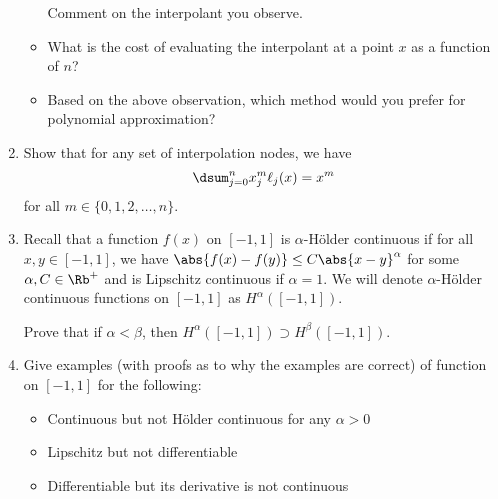 \documentclass{article}
\begin{document}
\begin{enumerate}
\begin{itemize}
\begin{itemize}
			\end{itemize}
			Comment on the interpolant you observe.
			\item
			What is the cost of evaluating the interpolant at a point $x$ as a function of $n$?
			\item
			Based on the above observation, which method would you prefer for polynomial approximation?
		\end{itemize}
		\item
			Show that for any set of interpolation nodes, we have
			$$\dsum_{j=0}^n x_j^m \ell_j(x) = x^m$$
			for all $m \in \{0,1,2,\ldots,n\}$.
		\item
		Recall that a function $f(x)$ on $[-1,1]$ is $\alpha$-H\"{o}lder continuous if for all $x,y \in [-1,1]$, we have $\abs{ f(x)-f(y)} \leq C \abs{x-y}^{\alpha}$ for some $\alpha,C \in \Rb^+$ and is Lipschitz continuous if $\alpha=1$. We will denote $\alpha$-H\"{o}lder continuous functions on $[-1,1]$ as $H^{\alpha}([-1,1])$.
		
		Prove that if $\alpha < \beta$, then $H^{\alpha}([-1,1]) \supset H^{\beta}([-1,1])$.

		\item
		Give examples (with proofs as to why the examples are correct) of function on $[-1,1]$ for the following:
		\begin{itemize}
			\item
			Continuous but not H\"{o}lder continuous for any $\alpha > 0$
			\item
			Lipschitz but not differentiable
			\item
			Differentiable but its derivative is not continuous
		\end{itemize}

	\end{enumerate}
\end{document}
